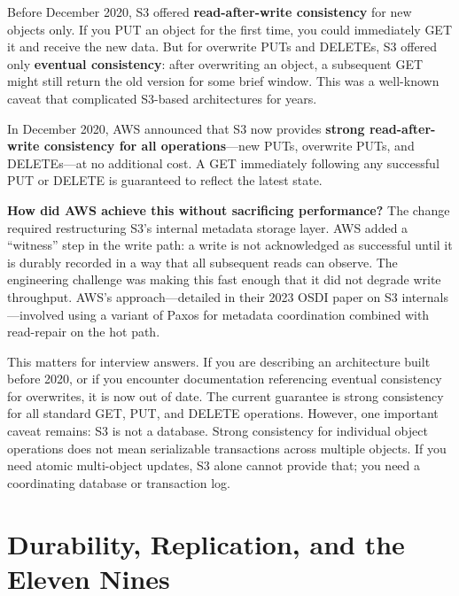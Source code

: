 \documentclass[11pt,a4paper]{article}
\begin{document}
Before December 2020, S3 offered \textbf{read-after-write consistency} for new objects only. If you PUT an object for the first time, you could immediately GET it and receive the new data. But for overwrite PUTs and DELETEs, S3 offered only \textbf{eventual consistency}: after overwriting an object, a subsequent GET might still return the old version for some brief window. This was a well-known caveat that complicated S3-based architectures for years.

In December 2020, AWS announced that S3 now provides \textbf{strong read-after-write consistency for all operations}---new PUTs, overwrite PUTs, and DELETEs---at no additional cost. A GET immediately following any successful PUT or DELETE is guaranteed to reflect the latest state.

\begin{thinkbox}
\textbf{How did AWS achieve this without sacrificing performance?} The change required restructuring S3's internal metadata storage layer. AWS added a ``witness'' step in the write path: a write is not acknowledged as successful until it is durably recorded in a way that all subsequent reads can observe. The engineering challenge was making this fast enough that it did not degrade write throughput. AWS's approach---detailed in their 2023 OSDI paper on S3 internals---involved using a variant of Paxos for metadata coordination combined with read-repair on the hot path.
\end{thinkbox}

This matters for interview answers. If you are describing an architecture built before 2020, or if you encounter documentation referencing eventual consistency for overwrites, it is now out of date. The current guarantee is strong consistency for all standard GET, PUT, and DELETE operations. However, one important caveat remains: S3 is not a database. Strong consistency for individual object operations does not mean serializable transactions across multiple objects. If you need atomic multi-object updates, S3 alone cannot provide that; you need a coordinating database or transaction log.

\section{Durability, Replication, and the Eleven Nines}
\end{document}
